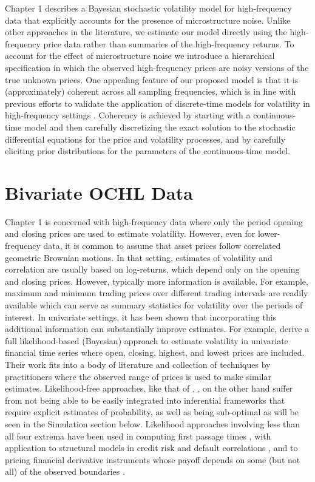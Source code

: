Chapter 1 describes a Bayesian stochastic volatility model for
high-frequency data that explicitly accounts for the presence of
microstructure noise.  Unlike other approaches in the literature, we
estimate our model directly using the high-frequency price data rather
than summaries of the high-frequency returns.  To account for the
effect of microstructure noise we introduce a hierarchical
specification in which the observed high-frequency prices are noisy
versions of the true unknown prices.  One appealing feature of our
proposed model is that it is (approximately) coherent across all
sampling frequencies, which is in line with previous efforts to
validate the application of discrete-time models for volatility in
high-frequency settings \cite{andersen1999forecasting}.  Coherency is
achieved by starting with a continuous-time model and then carefully
discretizing the exact solution to the stochastic differential
equations for the price and volatility processes, and by carefully
eliciting prior distributions for the parameters of the
continuous-time model.

\section{Bivariate OCHL Data}
Chapter 1 is concerned with high-frequency data where only the period
opening and closing prices are used to estimate volatility. However,
even for lower-frequency data, it is common to assume that asset
prices follow correlated geometric Brownian motions. In that
setting, estimates of volatility and correlation are usually based on
log-returns, which depend only on the opening and closing prices.
However, typically more information is available.  For example,
maximum and minimum trading prices over different trading intervals
are readily available which can serve as summary statistics for volatility over the periods of interest.  In univariate settings, it has been shown that
incorporating this additional information can substantially improve
estimates. For example, \cite{rodriguez2012} derive a full
likelihood-based (Bayesian) approach to estimate volatility in
univariate financial time series where open, closing, highest, and
lowest prices are included. Their work fits into a body of literature
and collection of techniques by practitioners where the observed range
of prices is used to make similar estimates. Likelihood-free
approaches, like that of \cite{rogers1991estimating},
\cite{rogers2008estimating}, on the other hand suffer from not being
able to be easily integrated into inferential frameworks that require
explicit estimates of probability, as well as being sub-optimal as
will be seen in the Simulation section below. Likelihood
approaches involving less than all four extrema have been used in
computing first passage times \cite{kou2016first, sacerdote2016first},
with application to structural models in credit risk and default
correlations \cite{haworth2008modelling, ching2014correlated}, and to
pricing financial derivative instruments whose payoff depends on some
(but not all) of the observed boundaries \cite{he1998double}.

